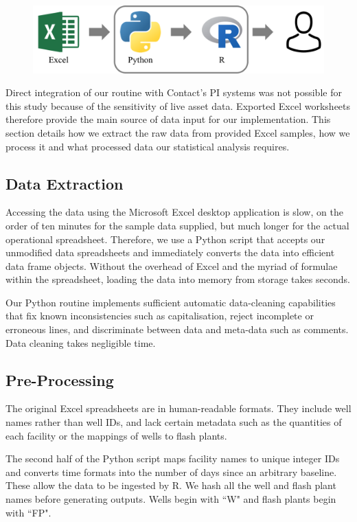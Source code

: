 \documentclass[a4paper, 12pt]{article}
\begin{document}
\begin{figure}
  \centering
  \includegraphics[width=0.5\linewidth]{media/workflow}
  \label{fig:workflow}
\end{figure}

Direct integration of our routine with Contact's PI systems was not possible for this study because of the sensitivity of live asset data. Exported Excel worksheets therefore provide the main source of data input for our implementation. This section details how we extract the raw data from provided Excel samples, how we process it and what processed data our statistical analysis requires.

\subsection{Data Extraction}
Accessing the data using the Microsoft Excel desktop application is slow, on the order of ten minutes for the sample data supplied, but much longer for the actual operational spreadsheet. Therefore, we use a Python script that accepts our unmodified data spreadsheets and immediately converts the data into efficient data frame objects. Without the overhead of Excel and the myriad of formulae within the spreadsheet, loading the data into memory from storage takes seconds.

Our Python routine implements sufficient automatic data-cleaning capabilities that fix known inconsistencies such as capitalisation, reject incomplete or erroneous lines, and discriminate between data and meta-data such as comments. Data cleaning takes negligible time.

\subsection{Pre-Processing}
The original Excel spreadsheets are in human-readable formats. They include well names rather than well IDs, and lack certain metadata such as the quantities of each facility or the mappings of wells to flash plants.

The second half of the Python script maps facility names to unique integer IDs and converts time formats into the number of days since an arbitrary baseline. These allow the data to be ingested by R. We hash all the well and flash plant names before generating outputs. Wells begin with ``W" and flash plants begin with ``FP".
\end{document}
